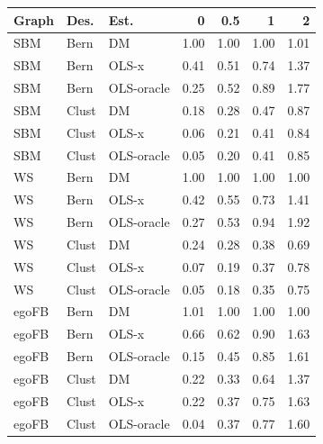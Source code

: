 \begin{tabular}{lllrrrr}
\toprule
Graph & Des. & Est. & 0 & 0.5 & 1 & 2 \\
\midrule
SBM & Bern & DM & 1.00 & 1.00 & 1.00 & 1.01 \\
SBM & Bern & OLS-x & 0.41 & 0.51 & 0.74 & 1.37 \\
SBM & Bern & OLS-oracle & 0.25 & 0.52 & 0.89 & 1.77 \\
SBM & Clust & DM & 0.18 & 0.28 & 0.47 & 0.87 \\
SBM & Clust & OLS-x & 0.06 & 0.21 & 0.41 & 0.84 \\
SBM & Clust & OLS-oracle & 0.05 & 0.20 & 0.41 & 0.85 \\
\midrule
WS & Bern & DM & 1.00 & 1.00 & 1.00 & 1.00 \\
WS & Bern & OLS-x & 0.42 & 0.55 & 0.73 & 1.41 \\
WS & Bern & OLS-oracle & 0.27 & 0.53 & 0.94 & 1.92 \\
WS & Clust & DM & 0.24 & 0.28 & 0.38 & 0.69 \\
WS & Clust & OLS-x & 0.07 & 0.19 & 0.37 & 0.78 \\
WS & Clust & OLS-oracle & 0.05 & 0.18 & 0.35 & 0.75 \\
\midrule
egoFB & Bern & DM & 1.01 & 1.00 & 1.00 & 1.00 \\
egoFB & Bern & OLS-x & 0.66 & 0.62 & 0.90 & 1.63 \\
egoFB & Bern & OLS-oracle & 0.15 & 0.45 & 0.85 & 1.61 \\
egoFB & Clust & DM & 0.22 & 0.33 & 0.64 & 1.37 \\
egoFB & Clust & OLS-x & 0.22 & 0.37 & 0.75 & 1.63 \\
egoFB & Clust & OLS-oracle & 0.04 & 0.37 & 0.77 & 1.60 \\
\bottomrule
\end{tabular}
